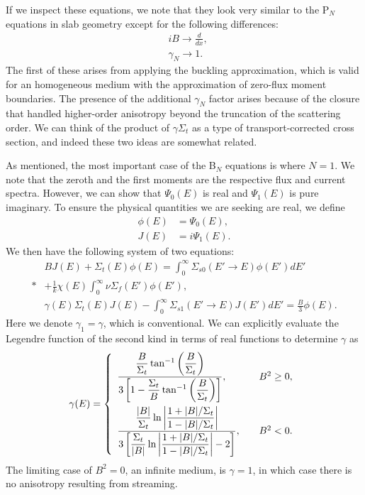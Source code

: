 If we inspect these equations, we note that they look very similar to the P$_N$ equations in slab geometry except for the following differences:
\begin{align}
   &i B \rightarrow \frac{d}{dx} , \nonumber \\
   &\gamma_N \rightarrow 1. \nonumber
\end{align}
The first of these arises from applying the buckling approximation, which is valid for an homogeneous medium with the approximation of zero-flux moment boundaries. The presence of the additional $\gamma_N$ factor arises because of the closure that handled higher-order anisotropy beyond the truncation of the scattering order. We can think of the product of $\gamma \Sigma_t$ as a type of transport-corrected cross section, and indeed these two ideas are somewhat related.

As mentioned, the most important case of the B$_N$ equations is where $N = 1$. We note that the zeroth and the first moments are the respective flux and current spectra. However, we can show that $\Psi_0(E)$ is real and $\Psi_1(E)$ is pure imaginary. To ensure the physical quantities we are seeking are real, we define
\begin{subequations}
\begin{align}
  \phi(E) &= \Psi_0(E), \\
  J(E) &= i \Psi_1(E).
\end{align}
\end{subequations}
We then have the following system of two equations:
\begin{subequations}
\begin{align}
  & B J(E) + \Sigma_t(E) \phi(E) = \int_0^\infty \Sigma_{s0}(E' \rightarrow E) \phi(E') dE' \nonumber \\*
  &+ \frac{1}{k} \chi(E) \int_0^\infty \nu\Sigma_f(E') \phi(E'), \\
  & \gamma(E) \Sigma_t(E) J(E) - \int_0^\infty \Sigma_{s1}(E' \rightarrow E) J(E') dE' = \frac{B}{3} \phi(E) .
\end{align}
\end{subequations}
Here we denote $\gamma_1 = \gamma$, which is conventional. We can explicitly evaluate the Legendre function of the second kind in terms of real functions to determine $\gamma$ as
\begin{align}
  \gamma(E) = \left\{ \begin{array}{l l}
  \dfrac{ \dfrac{B}{\Sigma_t}  \tan^{-1} \left( \dfrac{B}{\Sigma_t} \right) }{ 3 \left[ 1 - \dfrac{\Sigma_t}{B} \tan^{-1} \left( \dfrac{B}{\Sigma_t} \right) \right] }, & \quad B^2 \ge 0 , \vspace{0.4em} \\
  \dfrac{ \dfrac{|B|}{\Sigma_t} \ln \left| \dfrac{ 1 + |B|/\Sigma_t }{ 1 - |B|/\Sigma_t } \right| }{ 3 \left[ \dfrac{\Sigma_t}{|B|} \ln \left| \dfrac{ 1 + |B|/\Sigma_t }{ 1 - |B|/\Sigma_t } \right| - 2 \right] }, & \quad B^2 < 0 . \\ \end{array} \right.  
\end{align}
The limiting case of $B^2 = 0$, an infinite medium, is $\gamma = 1$, in which case there is no anisotropy resulting from streaming.




